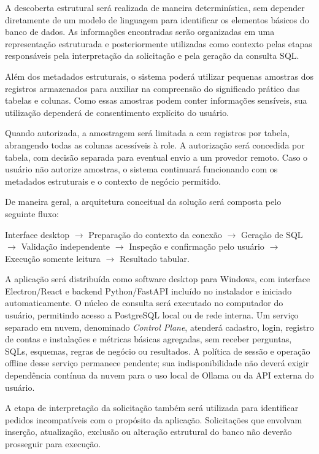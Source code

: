 A descoberta estrutural será realizada de maneira determinística, sem depender diretamente de um modelo de linguagem para identificar os elementos básicos do banco de dados. As informações encontradas serão organizadas em uma representação estruturada e posteriormente utilizadas como contexto pelas etapas responsáveis pela interpretação da solicitação e pela geração da consulta SQL.

Além dos metadados estruturais, o sistema poderá utilizar pequenas amostras dos registros armazenados para auxiliar na compreensão do significado prático das tabelas e colunas. Como essas amostras podem conter informações sensíveis, sua utilização dependerá de consentimento explícito do usuário.

Quando autorizada, a amostragem será limitada a cem registros por tabela, abrangendo todas as colunas acessíveis à role. A autorização será concedida por tabela, com decisão separada para eventual envio a um provedor remoto. Caso o usuário não autorize amostras, o sistema continuará funcionando com os metadados estruturais e o contexto de negócio permitido.

De maneira geral, a arquitetura conceitual da solução será composta pelo seguinte fluxo:

\begin{center}
Interface desktop $\rightarrow$ Preparação do contexto da conexão $\rightarrow$ Geração de SQL $\rightarrow$ Validação independente $\rightarrow$ Inspeção e confirmação pelo usuário $\rightarrow$ Execução somente leitura $\rightarrow$ Resultado tabular.
\end{center}

A aplicação será distribuída como software desktop para Windows, com interface Electron/React e backend Python/FastAPI incluído no instalador e iniciado automaticamente. O núcleo de consulta será executado no computador do usuário, permitindo acesso a PostgreSQL local ou de rede interna. Um serviço separado em nuvem, denominado \textit{Control Plane}, atenderá cadastro, login, registro de contas e instalações e métricas básicas agregadas, sem receber perguntas, SQLs, esquemas, regras de negócio ou resultados. A política de sessão e operação offline desse serviço permanece pendente; sua indisponibilidade não deverá exigir dependência contínua da nuvem para o uso local de Ollama ou da API externa do usuário.

A etapa de interpretação da solicitação também será utilizada para identificar pedidos incompatíveis com o propósito da aplicação. Solicitações que envolvam inserção, atualização, exclusão ou alteração estrutural do banco não deverão prosseguir para execução.

